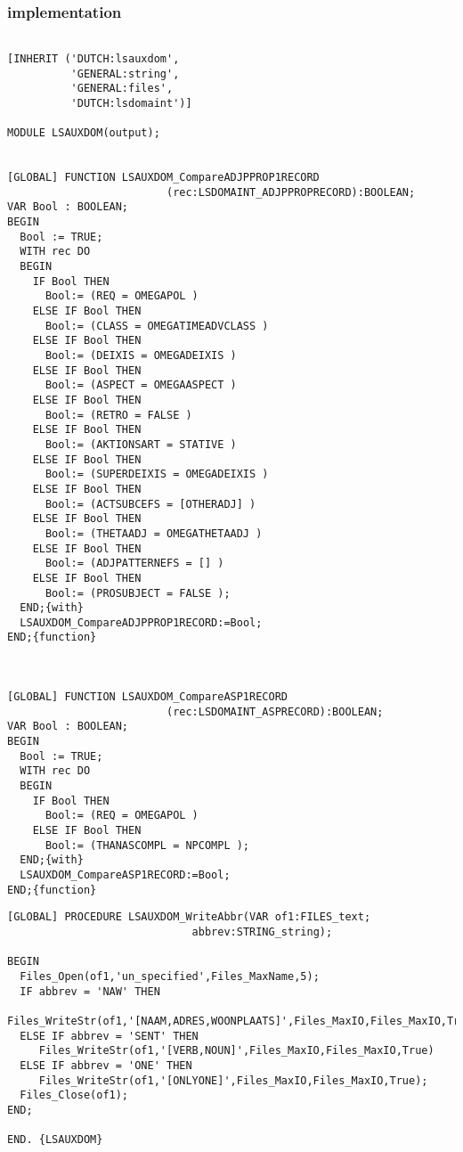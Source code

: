 \subsubsection{implementation}
\begin{verbatim}

[INHERIT ('DUTCH:lsauxdom',
          'GENERAL:string',
          'GENERAL:files',
          'DUTCH:lsdomaint')]

MODULE LSAUXDOM(output);


[GLOBAL] FUNCTION LSAUXDOM_CompareADJPPROP1RECORD
                         (rec:LSDOMAINT_ADJPPROPRECORD):BOOLEAN;
VAR Bool : BOOLEAN;
BEGIN
  Bool := TRUE;
  WITH rec DO
  BEGIN
    IF Bool THEN
      Bool:= (REQ = OMEGAPOL )
    ELSE IF Bool THEN
      Bool:= (CLASS = OMEGATIMEADVCLASS )
    ELSE IF Bool THEN
      Bool:= (DEIXIS = OMEGADEIXIS )
    ELSE IF Bool THEN
      Bool:= (ASPECT = OMEGAASPECT )
    ELSE IF Bool THEN
      Bool:= (RETRO = FALSE )
    ELSE IF Bool THEN
      Bool:= (AKTIONSART = STATIVE )
    ELSE IF Bool THEN
      Bool:= (SUPERDEIXIS = OMEGADEIXIS )
    ELSE IF Bool THEN
      Bool:= (ACTSUBCEFS = [OTHERADJ] )
    ELSE IF Bool THEN
      Bool:= (THETAADJ = OMEGATHETAADJ )
    ELSE IF Bool THEN
      Bool:= (ADJPATTERNEFS = [] )
    ELSE IF Bool THEN
      Bool:= (PROSUBJECT = FALSE );
  END;{with}
  LSAUXDOM_CompareADJPPROP1RECORD:=Bool;
END;{function}



[GLOBAL] FUNCTION LSAUXDOM_CompareASP1RECORD
                         (rec:LSDOMAINT_ASPRECORD):BOOLEAN;
VAR Bool : BOOLEAN;
BEGIN
  Bool := TRUE;
  WITH rec DO
  BEGIN
    IF Bool THEN
      Bool:= (REQ = OMEGAPOL )
    ELSE IF Bool THEN
      Bool:= (THANASCOMPL = NPCOMPL );
  END;{with}
  LSAUXDOM_CompareASP1RECORD:=Bool;
END;{function}
\end{verbatim}
\pagebreak
\begin{verbatim}
[GLOBAL] PROCEDURE LSAUXDOM_WriteAbbr(VAR of1:FILES_text;
                             abbrev:STRING_string);

BEGIN
  Files_Open(of1,'un_specified',Files_MaxName,5);
  IF abbrev = 'NAW' THEN
     Files_WriteStr(of1,'[NAAM,ADRES,WOONPLAATS]',Files_MaxIO,Files_MaxIO,True)
  ELSE IF abbrev = 'SENT' THEN
     Files_WriteStr(of1,'[VERB,NOUN]',Files_MaxIO,Files_MaxIO,True)
  ELSE IF abbrev = 'ONE' THEN
     Files_WriteStr(of1,'[ONLYONE]',Files_MaxIO,Files_MaxIO,True);
  Files_Close(of1);
END;

END. {LSAUXDOM}

\end{verbatim}



